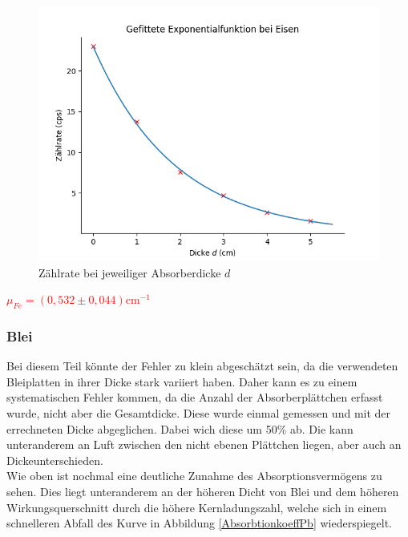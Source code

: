 \begin{figure}[ht]
    \centering
    \includegraphics[width = 12cm]{Bilder/Auswertung/AbsorbtioskFe.png}
    \caption{Zählrate bei jeweiliger Absorberdicke $d$}
    \label{AbsorbtionkoeffFe}
\end{figure}

\begin{center}
    \centering
    \textcolor{red}{$\mu_{Fe}= (0,532 \pm 0,044) \mathrm{cm}^{-1}$}
\end{center}

\subsubsection*{Blei}

Bei diesem Teil könnte der Fehler zu klein abgeschätzt sein, da die verwendeten Bleiplatten in ihrer Dicke stark variiert haben. Daher kann es zu einem 
systematischen Fehler kommen, da die Anzahl der Absorberplättchen erfasst wurde, nicht aber die Gesamtdicke. Diese wurde einmal gemessen und mit der 
errechneten Dicke abgeglichen. Dabei wich diese um 50\% ab. Die kann unteranderem an Luft zwischen den nicht ebenen Plättchen liegen, aber auch an Dickeunterschieden.\\
Wie oben ist nochmal eine deutliche Zunahme des Absorptionsvermögens zu sehen. Dies liegt unteranderem an der höheren Dicht von Blei und dem höheren 
Wirkungsquerschnitt durch die höhere Kernladungszahl, welche sich in einem schnelleren Abfall des Kurve in Abbildung \ref{AbsorbtionkoeffPb} wiederspiegelt.

